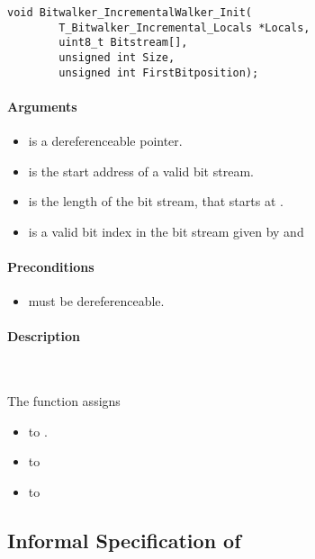 \begin{lstlisting}[style=acsl-block]
void Bitwalker_IncrementalWalker_Init(
        T_Bitwalker_Incremental_Locals *Locals,
        uint8_t Bitstream[],
        unsigned int Size,
        unsigned int FirstBitposition);
\end{lstlisting}


\paragraph{Arguments}
\begin{itemize}
   \item  {} is a dereferenceable pointer.
   \item {} is  the start address of a valid bit stream.
   \item {} is the length of the bit stream, that starts at .
   \item {} is a valid bit index in the bit stream given by  and 
\end{itemize}

\paragraph{Preconditions}
\begin{itemize}
    \item  {} must be dereferenceable.
\end{itemize}

\paragraph{Description}~

The function \init assigns
\begin{itemize}
    \item {}  to .
    \item {} to 
    \item {} to 
\end{itemize}


\clearpage

\subsection{Informal Specification of }

